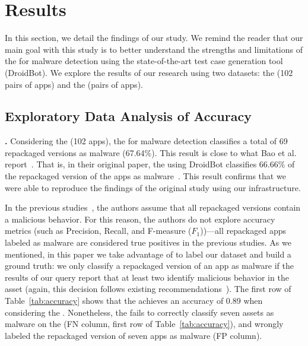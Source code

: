 \section{Results}\label{sec:results}


In this section, we detail the findings of our study.  We remind the reader that our main goal with this study is to
better understand the strengths and limitations of the \mas for malware detection using the state-of-the-art
test case generation tool (DroidBot). We explore
the results of our research using two datasets: the \sds (102 pairs of apps) and the
\cds (\apps pairs of apps).


\subsection{Exploratory Data Analysis of Accuracy}


{\bf \sds.} Considering the \sds (102 apps), the \mas for malware detection 
classifies a total of 69 repackaged versions as malware (67.64\%).
This result is close to what Bao et al. report~\cite{DBLP:conf/wcre/BaoLL18}.
That is, in their
original paper,  the \mas using DroidBot classifies 66.66\% of the
repackaged version of the apps as malware~\cite{DBLP:conf/wcre/BaoLL18}.
This result confirms that we were able to reproduce
the findings of the original study using our
infrastructure. 


In the previous studies~\cite{DBLP:conf/wcre/BaoLL18,DBLP:journals/jss/CostaMMSSBNR22},
the authors assume that all repackaged versions contain a
malicious behavior. For this reason, the authors do not
explore accuracy metrics (such as Precision, Recall, and
F-measure ($F_1$))---all repackaged apps labeled as
malware are considered true positives in the previous studies.
As we mentioned, in this paper we take advantage
of \vt to label our dataset and build a ground truth: we only
classify a repackaged version of an app as malware if the results
of our \vt query report that at least two
\ses identify malicious behavior in the asset (again, this
decision follows existing recommendations~\cite{vt-label,DBLP:journals/ese/KhanmohammadiEH19}).
The first row of Table~\ref{tab:accuracy} shows that the \mas achieves an accuracy of 0.89 when
considering the \sds. Nonetheless, the \mas fails
to correctly classify seven assets as malware on the \sds (FN column, first row of Table~\ref{tab:accuracy}),
and wrongly labeled the repackaged version of seven apps as malware (FP column).


